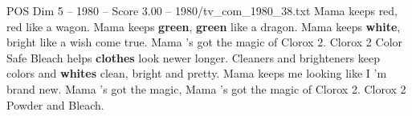 \begin{textsample}{POS Dim 5 – 1980 – Score 3.00 – 1980/tv\_com\_1980\_38.txt}  \label{ex:f5_pos_003}
Mama keeps red, red like a wagon.
Mama keeps \textbf{green}, \textbf{green} like a dragon.
Mama keeps \textbf{white}, bright like a wish come true.
Mama 's got the magic of Clorox 2.
Clorox 2 Color Safe Bleach helps \textbf{clothes} look newer longer.
Cleaners and brighteners keep colors and \textbf{whites} clean, bright and pretty.
Mama keeps me looking like I 'm brand new.
Mama 's got the magic, Mama 's got the magic of Clorox 2.
Clorox 2 Powder and Bleach.

\end{textsample}
